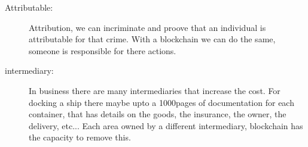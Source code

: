\documentclass[]{article}
\begin{document}
\begin{description}
\item[Attributable:] Attribution, we can incriminate and proove that an individual is attributable for that crime. With a blockchain we can do the same, someone is responsible for there actions.
\item[intermediary:] In business there are many intermediaries that increase the cost. For docking a ship there maybe upto a 1000pages of documentation for each container, that has details on the goods, the insurance, the owner, the delivery, etc... Each area owned by a different intermediary, blockchain has the capacity to remove this.


\end{description}
\end{document}
